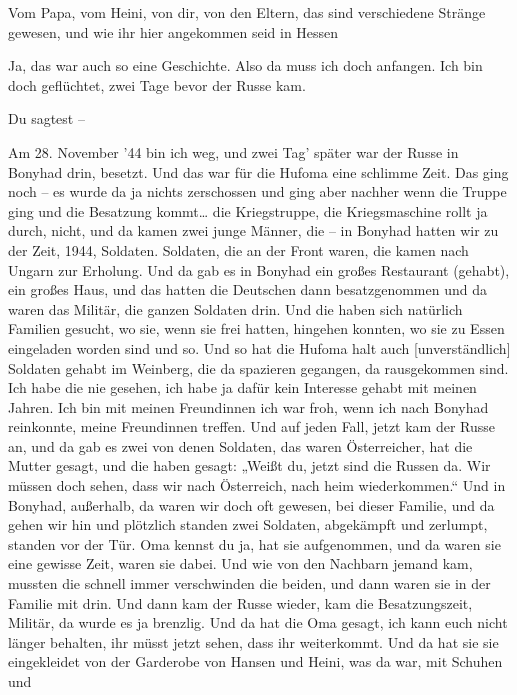 \documentclass[ngerman,]{article}
\providecommand{\tightlist}{%
  \setlength{\itemsep}{0pt}\setlength{\parskip}{0pt}}
\begin{document}
\begin{multicols}{2}
\begin{description}
\tightlist
\item[Ruth]
Vom Papa, vom Heini, von dir, von den Eltern, das sind verschiedene
Stränge gewesen, und wie ihr hier angekommen seid in Hessen
\item[Käthe]
Ja, das war auch so eine Geschichte. Also da muss ich doch anfangen. Ich
bin doch geflüchtet, zwei Tage bevor der Russe kam.
\item[Ruth]
Du sagtest –
\item[Käthe]
Am 28. November '44 bin ich weg, und zwei Tag' später war der Russe in
Bonyhad drin, besetzt. Und das war für die Hufoma eine schlimme Zeit.
Das ging noch – es wurde da ja nichts zerschossen und ging aber nachher
wenn die Truppe ging und die Besatzung kommt\ldots{} die Kriegstruppe,
die Kriegsmaschine rollt ja durch, nicht, und da kamen zwei junge
Männer, die – in Bonyhad hatten wir zu der Zeit, 1944, Soldaten.
Soldaten, die an der Front waren, die kamen nach Ungarn zur Erholung.
Und da gab es in Bonyhad ein großes Restaurant (gehabt), ein großes
Haus, und das hatten die Deutschen dann besatzgenommen und da waren das
Militär, die ganzen Soldaten drin. Und die haben sich natürlich Familien
gesucht, wo sie, wenn sie frei hatten, hingehen konnten, wo sie zu Essen
eingeladen worden sind und so. Und so hat die Hufoma halt auch
{[}unverständlich{]} Soldaten gehabt im Weinberg, die da spazieren
gegangen, da rausgekommen sind. Ich habe die nie gesehen, ich habe ja
dafür kein Interesse gehabt mit meinen Jahren. Ich bin mit meinen
Freundinnen ich war froh, wenn ich nach Bonyhad reinkonnte, meine
Freundinnen treffen. Und auf jeden Fall, jetzt kam der Russe an, und da
gab es zwei von denen Soldaten, das waren Österreicher, hat die Mutter
gesagt, und die haben gesagt: „Weißt du, jetzt sind die Russen da. Wir
müssen doch sehen, dass wir nach Österreich, nach heim wiederkommen.“
Und in Bonyhad, außerhalb, da waren wir doch oft gewesen, bei dieser
Familie, und da gehen wir hin und plötzlich standen zwei Soldaten,
abgekämpft und zerlumpt, standen vor der Tür. Oma kennst du ja, hat sie
aufgenommen, und da waren sie eine gewisse Zeit, waren sie dabei. Und
wie von den Nachbarn jemand kam, mussten die schnell immer verschwinden
die beiden, und dann waren sie in der Familie mit drin. Und dann kam der
Russe wieder, kam die Besatzungszeit, Militär, da wurde es ja brenzlig.
Und da hat die Oma gesagt, ich kann euch nicht länger behalten, ihr
müsst jetzt sehen, dass ihr weiterkommt. Und da hat sie sie eingekleidet
von der Garderobe von Hansen und Heini, was da war, mit Schuhen und

\end{description}
\end{multicols}
\end{document}
